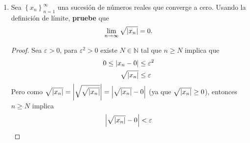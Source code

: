 \documentclass[12pt]{article}
\begin{document}
\begin{enumerate}
\begin{proof}
\begin{equation*}
\begin{split}
                \abs{\frac{1}{\sqrt{3n^2-1}}-0}=&\frac{1}{\sqrt{3n^2-1}}\\
                \leq&\frac{1}{\sqrt{2}n}, \quad \forall n\in\mathbb{N}\\
            \end{split}
        \end{equation*}
        Como se quería demostrar. Sea $\varepsilon>0$, por la propiedad arquimediana existe $N\in\mathbb{N}$ tal que $\frac{1}{N}<\varepsilon$, entonces como $\frac{1}{\sqrt{2}}<1$, se sigue que $\frac{1}{\sqrt{2}N}<\varepsilon$. Por tanto, si $n\geq N$ se tiene que $\frac{1}{\sqrt{2}n}\leq\frac{1}{\sqrt{2}N}$. Por tanto para todo $n\geq N$ se tiene que:
        \begin{equation*}
            \begin{split}
                \abs{\frac{1}{\sqrt{3n^2-1}}-0}\leq&\frac{1}{\sqrt{2}n}\\
                \leq&\frac{1}{\sqrt{2}N}\\
                <\varepsilon
            \end{split}
        \end{equation*}
        por tanto, de la definición de límite se sigue que $\lim_{n\rightarrow\infty}\frac{1}{\sqrt{3n^2-1}}=0$.
        \qed
    \end{proof}
    \item Sea $\left\{x_n\right\}_{n=1}^{\infty}$ una sucesión de números reales que converge a cero. Usando la definición de límite, \textbf{pruebe} que
    \begin{equation*}
        \lim_{n\rightarrow \infty}\sqrt{\left| x_n \right|}=0.
    \end{equation*}
    \begin{proof}
        Sea $\varepsilon>0$, para $\varepsilon^{2}>0$ existe $N\in\mathbb{N}$ tal que $n\geq N$ implica que
        \begin{equation*}
            \begin{split}
                0\leq\left| x_n-0 \right|&\leq \varepsilon^2\\
                \sqrt{\left| x_n \right|}&\leq \varepsilon\\
            \end{split}
        \end{equation*}
        Pero como $\sqrt{\left| x_n \right|}=\left| \sqrt{\sqrt{\left| x_n \right|}} \right|=\left| \sqrt{\left| x_n \right|}-0 \right|$ (ya que $\sqrt{\left| x_n \right|}\geq0$), entonces $n\geq N$ implica
        \begin{equation*}
            \abs{\sqrt{\abs{x_n}}-0}<\varepsilon

\end{equation*}
\end{proof}
\end{enumerate}
\end{document}
